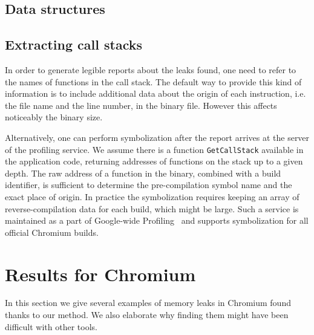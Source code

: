 \documentclass[preprint, numbers]{sigplanconf}
\newcommand{\comment}[1]{{\color{blue}{#1}}}
\begin{document}
\subsection{Data structures}

\comment{
Describe what is the complexity of record operations in tier 1 and 2
(respectively arrays and hash arrays), hash map for GetSize(p).
Mention about the analysis phase -- $O(\log n)$ complexity
for getting candidates with the highest count.
Maybe add pseudocode for Analysis().}

\subsection{Extracting call stacks}

In order to generate legible reports about the leaks found, one
need to refer to the names of functions in the call stack.
The default way to provide this kind of information is to
include additional data about the origin of each instruction,
i.e. the file name and the line number, in the binary file.
However this affects noticeably the binary size.

Alternatively, one can perform symbolization after the report
arrives at the server of the profiling service.
We assume there is a function \texttt{GetCallStack}
available in the application code, returning addresses of functions on the stack
up to a given depth.
The raw address of a function in the binary, combined with a build identifier,
is sufficient to determine the pre-compilation symbol name and the
exact place of origin.
In practice the symbolization requires keeping an array of reverse-compilation data for each build,
which might be large.
Such a service is maintained as a part of Google-wide Profiling~\cite{gwp}
and supports symbolization for all official Chromium builds.
\comment{Doesn't this part disclose too much about authors' affiliation?}

\section{Results for Chromium}

In this section we give several examples of memory leaks in Chromium found
thanks to our method.
We also elaborate why finding them might have been difficult with other tools.
\comment{More results to come. Should we refer to particular chromium bugs?
Maybe include charts with allocation history for each bug?
We should indicate whether bugs were found when profiling on local machines and which
with the end users.
Also mention something about the false positives ratio.}
\end{document}
